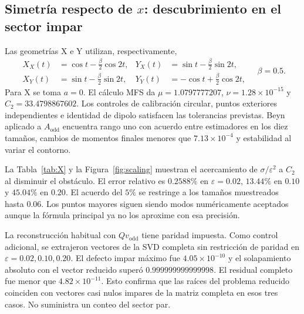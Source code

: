 \documentclass[11pt]{article}
\newcommand{\eps}{\varepsilon}
\begin{document}
\subsection{Simetría respecto de \texorpdfstring{$x$}{x}: descubrimiento en el sector impar}
Las geometrías X e Y utilizan, respectivamente,
\begin{equation}
 \begin{aligned}
 X_X(t)&=\cos t-\tfrac\beta2\cos2t,&Y_X(t)&=\sin t-\tfrac\beta2\sin2t,\\
 X_Y(t)&=\sin t-\tfrac\beta2\sin2t,&Y_Y(t)&=-\cos t+\tfrac\beta2\cos2t,
 \end{aligned}\quad \beta=0.5.\label{eq:profiles}
\end{equation}
Para X se toma $a=0$. El cálculo MFS da $\mu=1.0797777207$, $\nu=1.28\times10^{-15}$ y $C_2=33.4798867602$. Los controles de calibración circular, puntos exteriores independientes e identidad de dipolo satisfacen las tolerancias previstas. Beyn aplicado a $A_{\mathrm{odd}}$ encuentra rango uno con acuerdo entre estimadores en los diez tamaños, cambios de momentos finales menores que $7.13\times10^{-4}$ y estabilidad al variar el contorno.

La Tabla~\ref{tab:X} y la Figura~\ref{fig:scaling} muestran el acercamiento de $\sigma/\eps^2$ a $C_2$ al disminuir el obstáculo. El error relativo es $0.2588\%$ en $\eps=0.02$, $13.44\%$ en $0.10$ y $45.04\%$ en $0.20$. El acuerdo del $5\%$ se restringe a los tamaños muestreados hasta $0.06$. Los puntos mayores siguen siendo modos numéricamente aceptados aunque la fórmula principal ya no los aproxime con esa precisión.
\begin{table}[!htbp]\centering
\caption{Raíces del problema X obtenidas mediante Beyn en el sector impar y refinamiento SVD. El rango uno se refiere al interior del contorno reducido, no a la totalidad del espectro embebido.}
\label{tab:X}
\end{table}

La reconstrucción habitual con $Qv_{\mathrm{odd}}$ tiene paridad impuesta. Como control adicional, se extrajeron vectores de la SVD completa sin restricción de paridad en $\eps=0.02,0.10,0.20$. El defecto impar máximo fue $4.05\times10^{-10}$ y el solapamiento absoluto con el vector reducido superó $0.999999999999998$. El residual completo fue menor que $4.82\times10^{-11}$. Esto confirma que las raíces del problema reducido coinciden con vectores casi nulos impares de la matriz completa en esos tres casos. No suministra un conteo del sector par.
\end{document}
